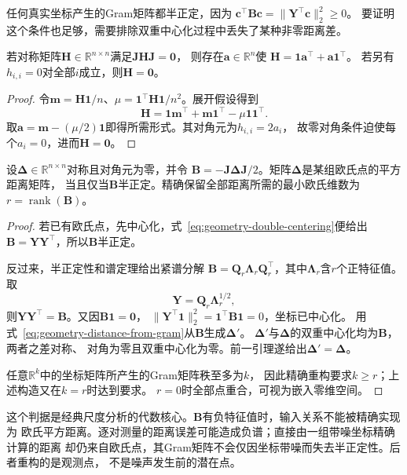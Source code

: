 任何真实坐标产生的Gram矩阵都半正定，因为
$\bm c^\top\bm B\bm c=\lVert\bm Y^\top\bm c\rVert_2^2\geq0$。
要证明这个条件也足够，需要排除双重中心化过程中丢失了某种非零距离差。

\begin{lemma}[双重中心化核的形式]
\label{lem:geometry-double-centering-kernel}
若对称矩阵$\bm H\in\mathbb R^{n\times n}$满足$\bm J\bm H\bm J=\bm0$，
则存在$\bm a\in\mathbb R^n$使
$\bm H=\bm1\bm a^\top+\bm a\bm1^\top$。
若另有$h_{i,i}=0$对全部$i$成立，则$\bm H=\bm0$。
\end{lemma}
\begin{proof}
令$\bm m=\bm H\bm1/n$、$\mu=\bm1^\top\bm H\bm1/n^2$。展开假设得到
\[
  \bm H=\bm1\bm m^\top+\bm m\bm1^\top-\mu\bm1\bm1^\top.
\]
取$\bm a=\bm m-(\mu/2)\bm1$即得所需形式。其对角元为$h_{i,i}=2a_i$，
故零对角条件迫使每个$a_i=0$，进而$\bm H=\bm0$。
\end{proof}

\begin{theorem}[有限距离的欧氏坐标重构]
\label{thm:geometry-euclidean-distance-embedding}
设$\bm\Delta\in\mathbb R^{n\times n}$对称且对角元为零，并令
$\bm B=-\bm J\bm\Delta\bm J/2$。矩阵$\bm\Delta$是某组欧氏点的平方距离矩阵，
当且仅当$\bm B$半正定。精确保留全部距离所需的最小欧氏维数为
$r=\operatorname{rank}(\bm B)$。
\end{theorem}
\begin{proof}
若已有欧氏点，先中心化，式~\eqref{eq:geometry-double-centering}便给出
$\bm B=\bm Y\bm Y^\top$，所以$\bm B$半正定。

反过来，半正定性和谱定理给出紧谱分解
$\bm B=\bm Q_r\bm\Lambda_r\bm Q_r^\top$，其中$\bm\Lambda_r$含$r$个正特征值。
取
\begin{equation}
  \bm Y=\bm Q_r\bm\Lambda_r^{1/2},
  \label{eq:geometry-classical-scaling-coordinates}
\end{equation}
则$\bm Y\bm Y^\top=\bm B$。又因$\bm B\bm1=\bm0$，
$\lVert\bm Y^\top\bm1\rVert_2^2=\bm1^\top\bm B\bm1=0$，坐标已中心化。
用式~\eqref{eq:geometry-distance-from-gram}从$\bm B$生成$\bm\Delta'$。
$\bm\Delta'$与$\bm\Delta$的双重中心化均为$\bm B$，两者之差对称、
对角为零且双重中心化为零。前一引理遂给出$\bm\Delta'=\bm\Delta$。

任意$\mathbb R^k$中的坐标矩阵所产生的Gram矩阵秩至多为$k$，
因此精确重构要求$k\geq r$；上述构造又在$k=r$时达到要求。
$r=0$时全部点重合，可视为嵌入零维空间。
\end{proof}

这个判据是经典尺度分析的代数核心。$\bm B$有负特征值时，输入关系不能被精确实现为
欧氏平方距离。逐对测量的距离误差可能造成负谱；直接由一组带噪坐标精确计算的距离
却仍来自欧氏点，其Gram矩阵不会仅因坐标带噪而失去半正定性。后者重构的是观测点，
不是噪声发生前的潜在点。

